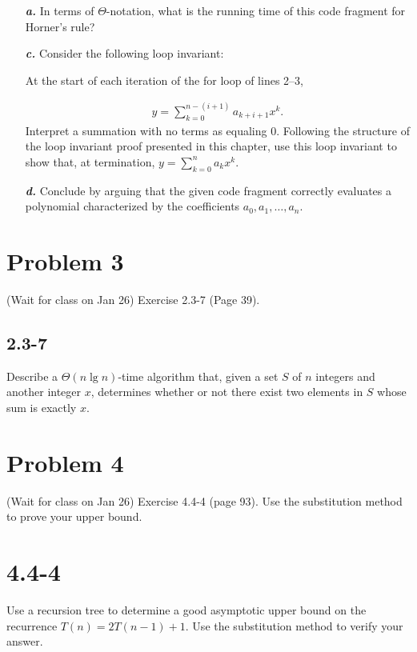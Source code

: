 \documentclass{../homework}
\begin{document}
\begin{itemize}
    \item[\textbf{\textit{a.}}] In terms of $\Theta $-notation, what is the running time of this code fragment for Horner’s rule?
    \item[\textbf{\textit{c.}}] Consider the following loop invariant:
    \begin{adjustwidth}{2em}{0pt}
        At the start of each iteration of the for loop of lines 2–3,
    \end{adjustwidth}
    \begin{gather*}
        y = \sum_{k=0}^{n-(i+1)} a_{k+i+1}x^k.
    \end{gather*}
    Interpret a summation with no terms as equaling $0$. Following the structure of the loop invariant proof presented in this chapter, use this loop invariant to show that, at termination, $y = \sum_{k=0}^{n} a_kx^k$.
    \item[\textbf{\textit{d.}}] Conclude by arguing that the given code fragment correctly evaluates a polynomial characterized by the coefficients $a_0, a_1, \dots, a_n$.
\end{itemize}

\newpage
\section*{Problem 3}
\begin{tcolorbox}
    (Wait for class on Jan 26) Exercise 2.3-7 (Page 39).
\end{tcolorbox}

\subsection*{2.3-7}
Describe a $\Theta \left(n \lg{n}\right)$-time algorithm that, given a set $S$ of $n$ integers and another integer $x$, determines whether or not there exist two elements in $S$ whose sum is exactly $x$.

\newpage
\section*{Problem 4}
\begin{tcolorbox}
    (Wait for class on Jan 26) Exercise 4.4-4 (page 93). Use the substitution method to prove your upper bound.
\end{tcolorbox}

\section*{4.4-4}
Use a recursion tree to determine a good asymptotic upper bound on the recurrence $T(n) = 2T(n-1) + 1$. Use the substitution method to verify your answer.
\end{document}
